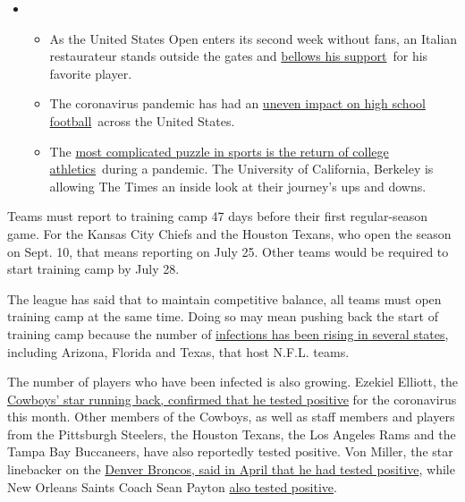 \begin{itemize}
\item
  \begin{itemize}
  \tightlist
  \item
    As the United States Open enters its second week without fans, an
    Italian restaurateur stands outside the gates and
    \href{https://www.nytimes3xbfgragh.onion/2020/09/06/sports/tennis/US-Open-Matteo-Berrettini-fan.html?action=click\&pgtype=Article\&state=default\&region=MAIN_CONTENT_2\&context=storylines_keepup}{bellows
    his support}~for his favorite player.
  \item
    The coronavirus pandemic has had an
    \href{https://www.nytimes3xbfgragh.onion/2020/09/03/sports/ncaafootball/high-school-football-coronavirus-pandemic.html?action=click\&pgtype=Article\&state=default\&region=MAIN_CONTENT_2\&context=storylines_keepup}{uneven
    impact on high school football}~across the United States.
  \item
    The
    \href{https://www.nytimes3xbfgragh.onion/2020/09/02/sports/ncaafootball/coronavirus-cal-athletics-season.html?action=click\&pgtype=Article\&state=default\&region=MAIN_CONTENT_2\&context=storylines_keepup}{most
    complicated puzzle in sports is the return of college
    athletics}~during a pandemic. The University of California, Berkeley
    is allowing The Times an inside look at their journey's ups and
    downs.
  \end{itemize}
\end{itemize}

Teams must report to training camp 47 days before their first
regular-season game. For the Kansas City Chiefs and the Houston Texans,
who open the season on Sept. 10, that means reporting on July 25. Other
teams would be required to start training camp by July 28.

The league has said that to maintain competitive balance, all teams must
open training camp at the same time. Doing so may mean pushing back the
start of training camp because the number of
\href{https://www.nytimes3xbfgragh.onion/2020/06/25/world/coronavirus-updates.html?action=click\&module=Spotlight\&pgtype=Homepage}{infections
has been rising in several states}, including Arizona, Florida and
Texas, that host N.F.L. teams.

The number of players who have been infected is also growing. Ezekiel
Elliott, the
\href{https://twitter.com/JoriEpstein/status/1275857955611648001}{Cowboys'
star running back, confirmed that he tested positive} for the
coronavirus this month. Other members of the Cowboys, as well as staff
members and players from the Pittsburgh Steelers, the Houston Texans,
the Los Angeles Rams and the Tampa Bay Buccaneers, have also reportedly
tested positive. Von Miller, the star linebacker on the
\href{https://www.nytimes3xbfgragh.onion/2020/04/16/sports/football/nfl-coronavirus-von-miller-allen.html}{Denver
Broncos, said in April that he had tested positive}, while New Orleans
Saints Coach Sean Payton
\href{https://www.cbssports.com/nfl/news/saints-hc-sean-payton-tests-positive-for-coronavirus-encourages-others-to-heed-warnings-and-stay-inside/}{also
tested positive}.

